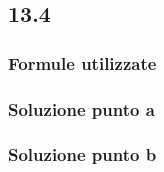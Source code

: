 \documentclass[../../main.tex]{subfiles}
\begin{document}
\subsection*{13.4}
\subsubsection*{Formule utilizzate}
\subsubsection*{Soluzione punto a}
\subsubsection*{Soluzione punto b}
\newpage
\end{document}
